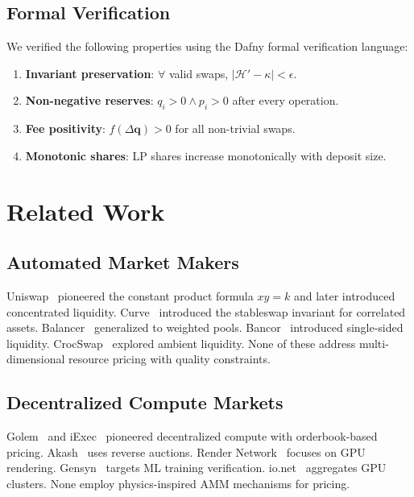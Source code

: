 \documentclass[11pt,twocolumn]{article}
\begin{document}
\subsection{Formal Verification}

We verified the following properties using the Dafny formal verification language:
\begin{enumerate}[leftmargin=1.4em]
    \item \textbf{Invariant preservation}: $\forall$ valid swaps, $|\mathcal{H}' - \kappa| < \epsilon$.
    \item \textbf{Non-negative reserves}: $q_i > 0 \wedge p_i > 0$ after every operation.
    \item \textbf{Fee positivity}: $f(\Delta\bm{q}) > 0$ for all non-trivial swaps.
    \item \textbf{Monotonic shares}: LP shares increase monotonically with deposit size.
\end{enumerate}

\section{Related Work}
\label{sec:related}

\subsection{Automated Market Makers}

Uniswap~\cite{adams2020uniswap,adams2021uniswapv3} pioneered the constant product formula $xy = k$ and later introduced concentrated liquidity. Curve~\cite{egorov2019stableswap} introduced the stableswap invariant for correlated assets. Balancer~\cite{martinelli2019balancer} generalized to weighted pools. Bancor~\cite{hertzog2017bancor} introduced single-sided liquidity. CrocSwap~\cite{crocswap2023} explored ambient liquidity. None of these address multi-dimensional resource pricing with quality constraints.

\subsection{Decentralized Compute Markets}

Golem~\cite{golem2016} and iExec~\cite{iexec2018} pioneered decentralized compute with orderbook-based pricing. Akash~\cite{akash2020} uses reverse auctions. Render Network~\cite{rendernetwork2021} focuses on GPU rendering. Gensyn~\cite{gensyn2023} targets ML training verification. io.net~\cite{ionet2024} aggregates GPU clusters. None employ physics-inspired AMM mechanisms for pricing.
\end{document}
